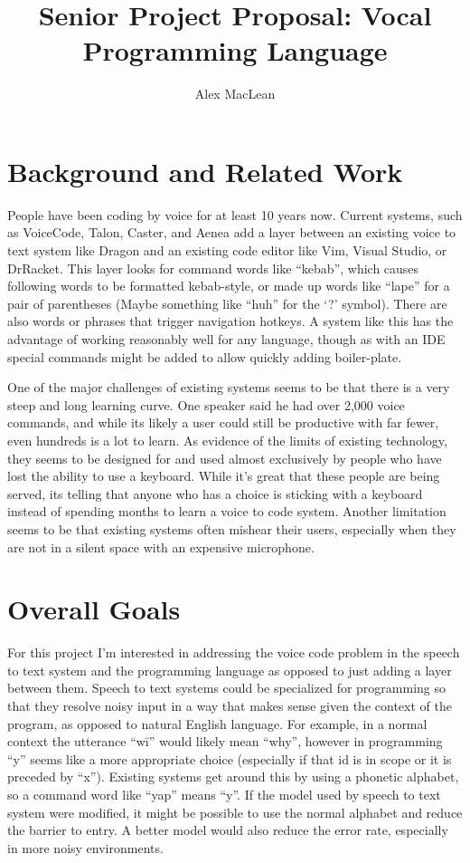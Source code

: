 \documentclass{article}
\title{Senior Project Proposal: Vocal Programming Language}
\author{Alex MacLean}
\begin{document}
\maketitle



\section{Background and Related Work}

People have been coding by voice for at least 10 years now. Current systems, such as VoiceCode, Talon, Caster, and Aenea \cite{nature} 
add a layer between an existing voice to text system like Dragon and an existing code editor like Vim, Visual Studio, or DrRacket. This layer looks for command words like ``kebab'', which causes following words to be formatted kebab-style, or made up words like ``lape'' for a pair of parentheses (Maybe something like ``huh'' for the `?' symbol). There are also words or phrases that trigger navigation hotkeys. A system like this has the advantage of working reasonably well for any language, though as with an IDE special commands might be added to allow quickly adding boiler-plate. 

One of the major challenges of existing systems seems to be that there is a very steep and long learning curve. One speaker said he had over 2,000 voice commands, and while its likely a user could still be productive with far fewer, even hundreds is a lot to learn. As evidence of the limits of existing technology, they seems to be designed for and used almost exclusively by people who have lost the ability to use a keyboard. While it's great that these people are being served, its telling that anyone who has a choice is sticking with a keyboard instead of spending months to learn a voice to code system. Another limitation seems to be that existing systems often mishear their users, especially when they are not in a silent space with an expensive microphone.

\section{Overall Goals}

For this project I'm interested in addressing the voice code problem in the speech to text system and the programming language as opposed to just adding a layer between them. Speech to text systems could be specialized for programming so that they resolve noisy input in a way that makes sense given the context of the program, as opposed to natural English language. For example, in a normal context the utterance ``wī'' would likely mean ``why'', however in programming ``y'' seems like a more appropriate choice (especially if that id is in scope or it is preceded by ``x''). Existing systems get around this by using a phonetic alphabet, so a command word like ``yap'' means ``y''. If the model used by speech to text system were modified, it might be possible to use the normal alphabet and reduce the barrier to entry. A better model would also reduce the error rate, especially in more noisy environments.
\end{document}
